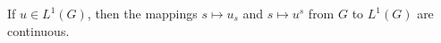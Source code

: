 \begin{lemma}
If $u \in L^1(G)$, then the mappings $s \mapsto u_s$ and $s \mapsto u^s$ from $G$ to $L^1(G)$ are continuous.
\end{lemma}
